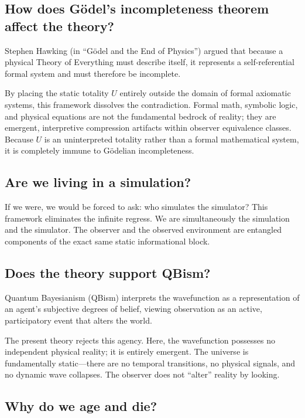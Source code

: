 \subsection*{How does Gödel's incompleteness theorem affect the theory?}

Stephen Hawking (in ``Gödel and the End of Physics'') argued that because a physical Theory of Everything must describe itself, it represents a self-referential formal system and must therefore be incomplete. 

By placing the static totality $U$ entirely outside the domain of formal axiomatic systems, this framework dissolves the contradiction.
Formal math, symbolic logic, and physical equations are not the fundamental bedrock of reality; they are emergent,
interpretive compression artifacts within observer equivalence classes. Because $U$ is an uninterpreted totality rather than a formal mathematical system, it is completely immune to Gödelian incompleteness.


\subsection*{Are we living in a simulation?}

If we were, we would be forced to ask: who simulates the simulator? This framework eliminates the infinite regress.
We are simultaneously the simulation and the simulator.
The observer and the observed environment are entangled components of the exact same static informational block.


\subsection*{Does the theory support QBism?}

Quantum Bayesianism (QBism) interprets the wavefunction as a representation of an agent’s subjective degrees of belief,
viewing observation as an active, participatory event that alters the world.

The present theory rejects this agency. Here, the wavefunction possesses no independent physical reality; it is entirely emergent.
The universe is fundamentally static—there are no temporal transitions, no physical signals, and no dynamic wave collapses.
The observer does not ``alter'' reality by looking.


\subsection*{Why do we age and die?}

